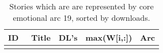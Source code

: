 \begin{longtable}{l | l | l | l  | c}
ID & ~Title & DL's & max(W[i,:]) & Arc\\
\hline
\endhead
\caption{Stories which are are represented by core emotional arc 19, sorted by downloads.}
\end{longtable}
